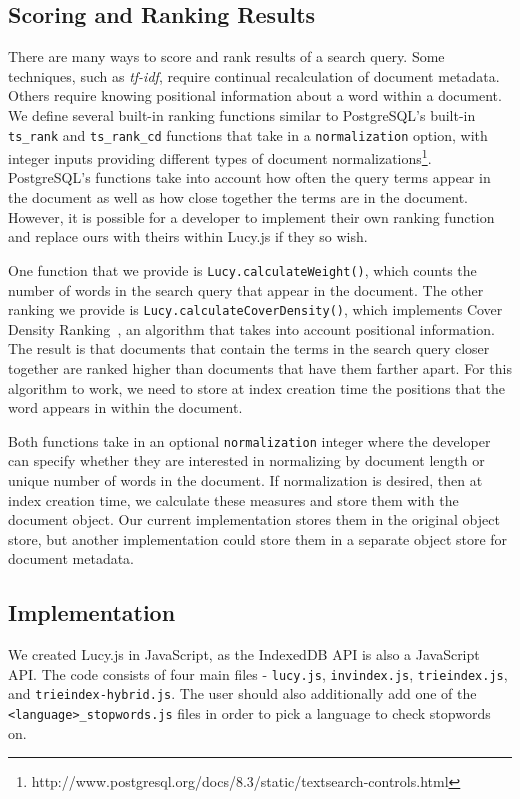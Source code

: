 \documentclass{vldb}
\begin{document}
\subsection{Scoring and Ranking Results}

There are many ways to score and rank results of a search query. Some techniques, such as \textit{tf-idf}, require continual recalculation of document metadata. Others require knowing positional information about a word within a document. We define several built-in ranking functions similar to PostgreSQL's built-in \texttt{ts\_rank} and \texttt{ts\_rank\_cd} functions that take in a \texttt{normalization} option, with integer inputs providing different types of document normalizations\footnote{http://www.postgresql.org/docs/8.3/static/textsearch-controls.html}.
PostgreSQL's functions take into account how often the query terms appear in the document as well as how close together the terms are in the document. However, it is possible for a developer to implement their own ranking function and replace ours with theirs within Lucy.js if they so wish.

One function that we provide is \texttt{Lucy.calculateWeight()}, which counts the number of words in the search query that appear in the document. The other ranking we provide is \texttt{Lucy.calculateCoverDensity()}, which implements Cover Density Ranking~\cite{li2002improvement}, an algorithm that takes into account positional information. The result is that documents that contain the terms in the search query closer together are ranked higher than documents that have them farther apart. For this algorithm to work, we need to store at index creation time the positions that the word appears in within the document. 

Both functions take in an optional \texttt{normalization} integer where the developer can specify whether they are interested in normalizing by document length or unique number of words in the document. If normalization is desired, then at index creation time, we calculate these measures and store them with the document object. Our current implementation stores them in the original object store, but another implementation could store them in a separate object store for document metadata.

\subsection{Implementation}

We created Lucy.js in JavaScript, as the IndexedDB API is also a JavaScript API. The code consists of four main files - \texttt{lucy.js}, \texttt{invindex.js}, \texttt{trieindex.js},  and \texttt{trieindex-hybrid.js}. The user should also additionally add one of the \texttt{<language>\_stopwords.js} files in order to pick a language to check stopwords on.
\end{document}
